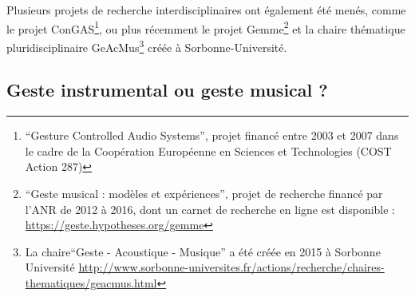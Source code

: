 \indent Plusieurs projets de recherche interdisciplinaires ont également été menés, comme le projet ConGAS\footnote{``Gesture Controlled Audio Systems'', projet financé entre 2003 et 2007 dans le cadre de la Coopération Européenne en Sciences et Technologies (COST Action 287)}, ou plus récemment le projet Gemme\footnote{``Geste musical : modèles et expériences'', projet de recherche financé par l'ANR de 2012 à 2016, dont un carnet de recherche en ligne est disponible : \url{https://geste.hypotheses.org/gemme}} et la chaire thématique pluridisciplinaire GeAcMus\footnote{La chaire``Geste - Acoustique - Musique'' a été créée en 2015 à Sorbonne Université \url{http://www.sorbonne-universites.fr/actions/recherche/chaires-thematiques/geacmus.html}} créée à Sorbonne-Université.



\subsection{Geste instrumental ou geste musical ?}

